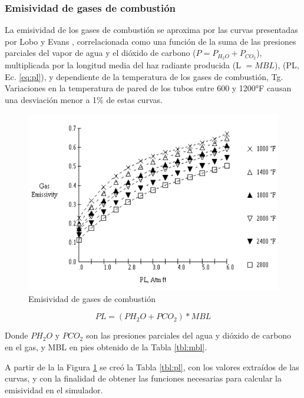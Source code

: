 \subsubsection{Emisividad de gases de combustión}
\par La emisividad de los gases de combustión se aproxima por las curvas presentadas por Lobo y Evans \cite{bib:rad}, correlacionada como una función de la suma de las presiones parciales del vapor de agua y el dióxido de carbono ($P = P_{H_2O} + P_{CO_2}$), multiplicada por la longitud media del haz radiante producida (L $= MBL$), (PL, Ec. \ref{eq:pl}), y dependiente de la temperatura de los gases de combustión, Tg. Variaciones en la temperatura de pared de los tubos entre 600 y 1200°F causan una desviación menor a 1\% de estas curvas.
\begin{figure}[H]
\begin{center}
\includegraphics[scale=0.42]{images/emiss}
\caption[Emisividad de gases de combustión]{Emisividad de gases de combustión \cite{bib:mekler}}
\label{fig:emiss}
\end{center}
\end{figure}
\begin{equation}
\label{eq:pl}
PL = (PH_2O + PCO_2) * MBL
\end{equation}
\par Donde $PH_2O$ y $PCO_2$ son las presiones parciales del agua y dióxido de carbono en el gas, y MBL en pies obtenido de la Tabla \ref{tbl:mbl}.
\par A partir de la la Figura \ref{fig:emiss} se creó la Tabla \ref{tbl:pl}, con los valores extraídos de las curvas, y con la finalidad de obtener las funciones necesarias para calcular la emisividad en el simulador.
